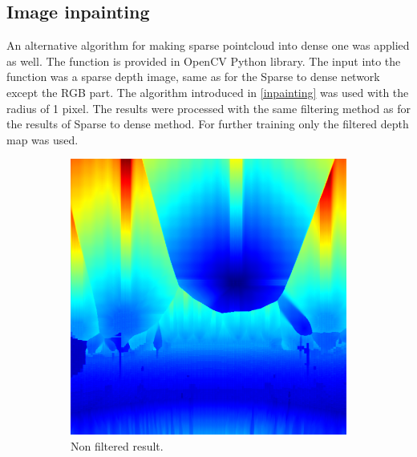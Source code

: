 \documentclass[twoside]{ctuthesis}
\theoremstyle{plain}
\theoremstyle{definition}
\theoremstyle{note}
\begin{document}
\subsection{Image inpainting}
An alternative algorithm for making sparse pointcloud into dense one was applied as well. The function is provided in OpenCV Python library. The input into the function was a sparse depth image, same as for the Sparse to dense network except the RGB part. The algorithm introduced in \ref{inpainting} was used with the radius of 1 pixel. The results were processed with the same filtering method as for the results of Sparse to dense method. For further training only the filtered depth map was used.
\begin{figure}[h]
	\centering
	\begin{subfigure}[b]{0.3\textwidth}
		\centering
		\includegraphics[width=\textwidth]{raw_inpaint.png}
		\caption{Non filtered result.}
	\end{subfigure}
	\hfill
	\begin{subfigure}[b]{0.3\textwidth}
		\centering

\end{subfigure}
\end{figure}
\end{document}
